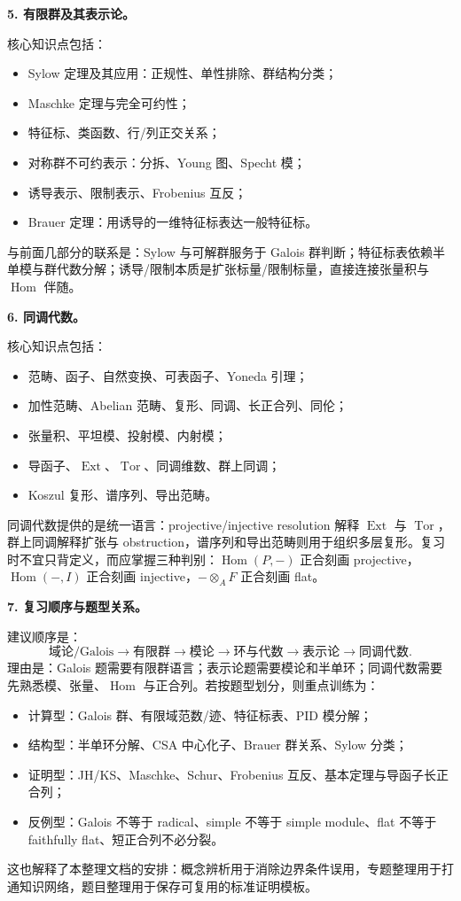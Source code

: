 \documentclass[a4paper]{ctexart}
\theoremstyle{definition}
\theoremstyle{analysis}
\theoremstyle{plain}
\begin{document}
\medskip
\textbf{5. 有限群及其表示论。}

核心知识点包括：
\begin{itemize}
  \item Sylow 定理及其应用：正规性、单性排除、群结构分类；
  \item Maschke 定理与完全可约性；
  \item 特征标、类函数、行/列正交关系；
  \item 对称群不可约表示：分拆、Young 图、Specht 模；
  \item 诱导表示、限制表示、Frobenius 互反；
  \item Brauer 定理：用诱导的一维特征标表达一般特征标。
\end{itemize}
与前面几部分的联系是：Sylow 与可解群服务于 Galois 群判断；特征标表依赖半单模与群代数分解；诱导/限制本质是扩张标量/限制标量，直接连接张量积与 \(\operatorname{Hom}\) 伴随。

\medskip
\textbf{6. 同调代数。}

核心知识点包括：
\begin{itemize}
  \item 范畴、函子、自然变换、可表函子、Yoneda 引理；
  \item 加性范畴、Abelian 范畴、复形、同调、长正合列、同伦；
  \item 张量积、平坦模、投射模、内射模；
  \item 导函子、\(\operatorname{Ext}\)、\(\operatorname{Tor}\)、同调维数、群上同调；
  \item Koszul 复形、谱序列、导出范畴。
\end{itemize}
同调代数提供的是统一语言：projective/injective resolution 解释 \(\operatorname{Ext}\) 与 \(\operatorname{Tor}\)，群上同调解释扩张与 obstruction，谱序列和导出范畴则用于组织多层复形。复习时不宜只背定义，而应掌握三种判别：\(\operatorname{Hom}(P,-)\) 正合刻画 projective，\(\operatorname{Hom}(-,I)\) 正合刻画 injective，\(-\otimes_A F\) 正合刻画 flat。

\medskip
\textbf{7. 复习顺序与题型关系。}

建议顺序是：
\[
  \text{域论/Galois}
  \longrightarrow
  \text{有限群}
  \longrightarrow
  \text{模论}
  \longrightarrow
  \text{环与代数}
  \longrightarrow
  \text{表示论}
  \longrightarrow
  \text{同调代数}.
\]
理由是：Galois 题需要有限群语言；表示论题需要模论和半单环；同调代数需要先熟悉模、张量、\(\operatorname{Hom}\) 与正合列。若按题型划分，则重点训练为：
\begin{itemize}
  \item 计算型：Galois 群、有限域范数/迹、特征标表、PID 模分解；
  \item 结构型：半单环分解、CSA 中心化子、Brauer 群关系、Sylow 分类；
  \item 证明型：JH/KS、Maschke、Schur、Frobenius 互反、基本定理与导函子长正合列；
  \item 反例型：Galois 不等于 radical、simple 不等于 simple module、flat 不等于 faithfully flat、短正合列不必分裂。
\end{itemize}
这也解释了本整理文档的安排：概念辨析用于消除边界条件误用，专题整理用于打通知识网络，题目整理用于保存可复用的标准证明模板。
\end{document}
